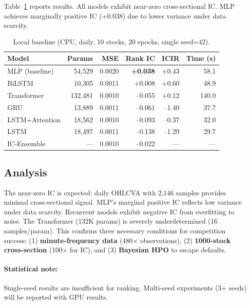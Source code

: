 \documentclass[sigconf,10pt]{acmart}
\begin{document}
Table~\ref{tab:local} reports results. All models exhibit near-zero cross-sectional IC. MLP achieves marginally positive IC (+0.038) due to lower variance under data scarcity.

\begin{table}[htbp]
\centering
\caption{Local baseline (CPU, daily, 10 stocks, 20 epochs, single seed=42).}
\label{tab:local}
\begin{tabular}{@{}lrrrrr@{}}
\toprule
\textbf{Model} & \textbf{Params} & \textbf{MSE} & \textbf{Rank IC} & \textbf{ICIR} & \textbf{Time (s)} \\
\midrule
MLP (baseline)   & 54,529 & 0.0020 & \textbf{+0.038} & +0.43 & 58.1 \\
BiLSTM           & 10,305 & 0.0011 & +0.008 & +0.60 & 48.9 \\
Transformer      & 132,481 & 0.0010 & --0.055 & +0.12 & 140.0 \\
GRU              & 13,889 & 0.0011 & --0.061 & --1.40 & 37.7 \\
LSTM+Attention   & 18,562 & 0.0010 & --0.093 & --0.37 & 32.0 \\
LSTM             & 18,497 & 0.0011 & --0.138 & --1.29 & 29.7 \\
\midrule
IC-Ensemble      & --- & 0.0010 & --0.022 & --- & --- \\
\bottomrule
\end{tabular}
\end{table}

\subsection{Analysis}

The near-zero IC is expected: daily OHLCVA with 2,146 samples provides minimal cross-sectional signal. MLP's marginal positive IC reflects low variance under data scarcity. Recurrent models exhibit negative IC from overfitting to noise. The Transformer (132K params) is severely underdetermined (16 samples/param). This confirms three necessary conditions for competition success: (1) \textbf{minute-frequency data} (480$\times$ observations), (2) \textbf{1000-stock cross-section} (100$\times$ for IC), and (3) \textbf{Bayesian HPO} to escape defaults.

\paragraph{Statistical note:} Single-seed results are insufficient for ranking. Multi-seed experiments (3+ seeds) will be reported with GPU results.
\end{document}
